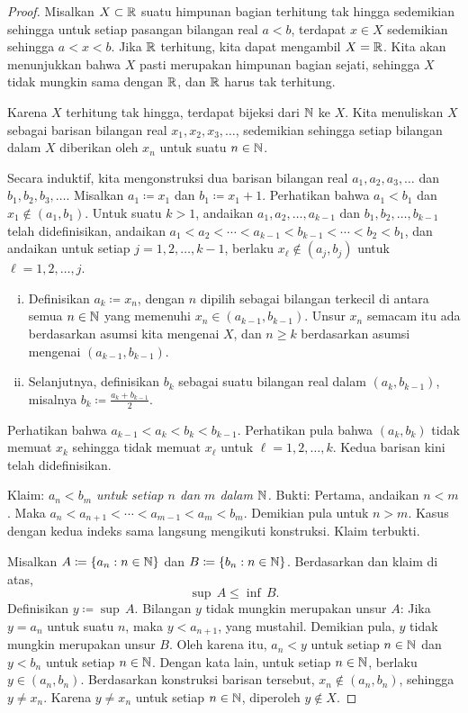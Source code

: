 \begin{proof}
Misalkan $X \subset {\mathbb{R}}$ suatu himpunan bagian
terhitung tak hingga sedemikian sehingga untuk setiap pasangan bilangan real
$a < b$, terdapat $x \in X$ sedemikian sehingga $a < x < b$.  Jika ${\mathbb{R}}$ terhitung,
kita dapat mengambil $X = {\mathbb{R}}$.  Kita akan menunjukkan bahwa $X$ pasti merupakan
himpunan bagian sejati, sehingga $X$ tidak mungkin sama dengan ${\mathbb{R}}$, dan ${\mathbb{R}}$ harus
tak terhitung.

Karena $X$ terhitung tak hingga,
terdapat bijeksi dari ${\mathbb{N}}$ ke $X$.  Kita menuliskan $X$ sebagai
barisan bilangan real $x_1, x_2, x_3,\ldots$, sedemikian sehingga
setiap bilangan dalam $X$
diberikan oleh $x_n$ untuk suatu $n \in {\mathbb{N}}$.

Secara induktif, kita
mengonstruksi dua barisan bilangan real $a_1,a_2,a_3,\ldots$ dan
$b_1,b_2,b_3,\ldots$.  Misalkan
$a_1 \coloneqq x_1$ dan $b_1 \coloneqq x_1+1$.
Perhatikan bahwa $a_1 < b_1$ dan
$x_1 \notin (a_1,b_1)$.
Untuk suatu $k > 1$,
andaikan $a_1,a_2,\ldots,a_{k-1}$ dan $b_1,b_2,\ldots,b_{k-1}$ telah
didefinisikan,
andaikan
$a_1 < a_2 < \cdots < a_{k-1} < b_{k-1} < \cdots < b_2 < b_1$,
dan andaikan
untuk setiap $j=1,2,\ldots,k-1$,
berlaku $x_\ell \notin (a_{j},b_{j})$
untuk $\ell=1,2,\ldots,j$.
\begin{enumerate}[(i)]
\item Definisikan $a_k \coloneqq x_n$, dengan $n$ dipilih sebagai bilangan terkecil di antara semua $n \in {\mathbb{N}}$
yang memenuhi $x_n \in (a_{k-1},b_{k-1})$.  Unsur $x_n$ semacam itu ada berdasarkan
asumsi kita mengenai $X$, dan $n \geq k$ berdasarkan asumsi mengenai $(a_{k-1},b_{k-1})$.
\item Selanjutnya, definisikan $b_k$ sebagai suatu bilangan real dalam $(a_{k},b_{k-1})$,
misalnya $b_k \coloneqq \frac{a_k+b_{k-1}}{2}$.
\end{enumerate}
Perhatikan bahwa %
$a_{k-1} < a_k < b_k < b_{k-1}$.
Perhatikan pula bahwa $(a_{k},b_{k})$ tidak memuat $x_k$ sehingga
tidak memuat $x_{\ell}$ untuk $\ell=1,2,\ldots,k$.
Kedua barisan kini telah didefinisikan.

Klaim: \emph{$a_n < b_m$ untuk setiap $n$ dan $m$ dalam ${\mathbb{N}}$.} Bukti: Pertama,
andaikan $n < m$.  Maka $a_n < a_{n+1} < \cdots < a_{m-1} < a_m < b_m$.
Demikian pula untuk $n > m$.  Kasus dengan kedua indeks sama langsung mengikuti konstruksi.  Klaim terbukti.

Misalkan $A \coloneqq \{ a_n : n \in {\mathbb{N}} \}$ dan $B \coloneqq \{ b_n : n \in {\mathbb{N}} \}$.
Berdasarkan  dan klaim di atas,
\begin{equation*}
\sup\, A \leq \inf\, B .
\end{equation*}
Definisikan $y \coloneqq \sup\, A$.  Bilangan $y$ tidak mungkin merupakan unsur $A$: Jika $y = a_n$
untuk suatu $n$, maka $y < a_{n+1}$, yang mustahil.
Demikian pula, $y$ tidak mungkin merupakan unsur $B$.  Oleh karena itu,
$a_n < y$ untuk setiap $n\in {\mathbb{N}}$
dan $y < b_n$ untuk setiap $n\in {\mathbb{N}}$.
Dengan kata lain, untuk setiap $n \in {\mathbb{N}}$, berlaku $y \in (a_n,b_n)$.
Berdasarkan konstruksi barisan tersebut, $x_n \notin (a_n,b_n)$,
sehingga $y \neq x_n$.  Karena $y \neq x_n$ untuk setiap $n \in {\mathbb{N}}$, diperoleh $y
\notin X$.


\end{proof}
